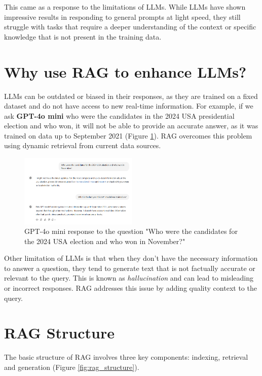 \documentclass[conference]{IEEEtran}
\begin{document}
This came as a response to the limitations of LLMs. While LLMs have shown impressive results in
responding to general prompts at light speed, they still struggle with tasks
that require a deeper understanding of the context or specific knowledge that is not present in the training data.

\section{Why use RAG to enhance LLMs?}
LLMs can be outdated or biased in their responses, as they are trained on a fixed dataset and do not have access to new real-time information.
For example, if we ask \textbf{GPT-4o mini} who were the candidates in the 2024 USA presidential election and who won,
it will not be able to provide an accurate answer, as it was trained on data up to September 2021 (Figure \ref{fig:gpt4o_mini_response}).
RAG overcomes this problem using dynamic retrieval from current data sources.

\begin{figure}[htbp!]
    \centerline{\includegraphics[width=0.5\textwidth]{images/gpt4o_mini_response.png}}
    \caption{GPT-4o mini response to the question "Who were the candidates for the 2024 USA election and who won in November?"}
    \label{fig:gpt4o_mini_response}
\end{figure}

Other limitation of LLMs is that when they don't have the necessary information to answer a question, they tend to generate text
that is not factually accurate or relevant to the query. This is known as \textit{hallucination} and can lead to misleading or incorrect responses.
RAG addresses this issue by adding quality context to the query.

\section{RAG Structure}
The basic structure of RAG involves three key components: indexing, retrieval and generation (Figure \ref{fig:rag_structure}).
\end{document}
